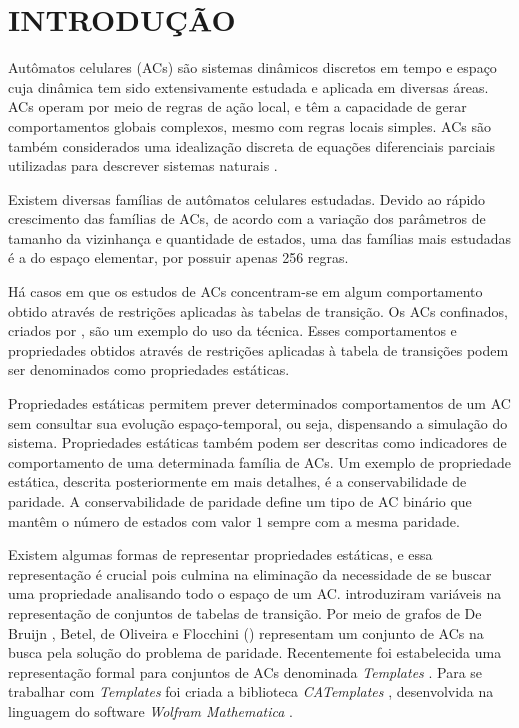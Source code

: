 \section{INTRODUÇÃO}
\label{sec:introducao}

Autômatos celulares (ACs) são sistemas dinâmicos discretos em tempo e espaço cuja dinâmica tem sido extensivamente estudada e aplicada em diversas áreas. %
ACs operam por meio de regras de ação local, e têm a capacidade de gerar comportamentos globais complexos, mesmo com regras locais simples. %
ACs são também considerados uma idealização discreta de equações diferenciais parciais utilizadas para descrever sistemas naturais \cite{wolfram1994cellular}.

Existem diversas famílias de autômatos celulares estudadas. Devido ao rápido crescimento das famílias de ACs, de acordo com a variação dos parâmetros de tamanho da vizinhança e quantidade de estados, uma das famílias mais estudadas é a do espaço elementar, por possuir apenas 256 regras.

Há casos em que os estudos de ACs concentram-se em algum comportamento obtido através de restrições aplicadas às tabelas de transição. Os ACs confinados, criados por , são um exemplo do uso da técnica. Esses comportamentos e propriedades obtidos através de restrições aplicadas à tabela de transições podem ser denominados como propriedades estáticas.

Propriedades estáticas permitem prever determinados comportamentos de um AC sem consultar sua evolução espaço-temporal, ou seja, dispensando a simulação do sistema. Propriedades estáticas também podem ser descritas como indicadores de comportamento de uma determinada família de ACs. Um exemplo de propriedade estática, descrita posteriormente em mais detalhes, é a conservabilidade de paridade. A conservabilidade de paridade define um tipo de AC binário que mantêm o número de estados com valor $1$ sempre com a mesma paridade.%

Existem algumas formas de representar propriedades estáticas, e essa representação é crucial pois culmina na eliminação da necessidade de se buscar uma propriedade analisando todo o espaço de um AC.  introduziram variáveis na representação de conjuntos de tabelas de transição. Por meio de grafos de De Bruijn \cite{Bruijn946combinatorial}, Betel, de Oliveira e Flocchini (\citeyear{Betel2013}) representam um conjunto de ACs na busca pela solução do problema de paridade. Recentemente foi estabelecida uma representação formal para conjuntos de ACs denominada \textit{Templates} \cite{deOliveira2014,deOliveira2014b}. Para se trabalhar com  \textit{Templates} foi criada a biblioteca \textit{CATemplates} \cite{CATemplates}, desenvolvida na linguagem do software \textit{Wolfram Mathematica} \cite{woframMathematica10}.

